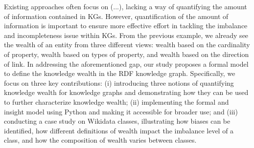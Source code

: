 Existing approaches often focus on (...), lacking a way of quantifying the amount of information contained in KGs. However, quantification of the amount of information is important to ensure more effective effort in tackling the imbalance and incompleteness issue within KGs. From the previous example, we already see the wealth of an entity from three different views: wealth based on the cardinality of property, wealth based on types of property, and wealth based on the direction of link. In addressing the aforementioned gap, our study proposes a formal model to define the knowledge wealth in the RDF knowledge graph. Specifically, we focus on three key contributions: (i) introducing three notions of quantifying knowledge wealth for knowledge graphs and demonstrating how they can be used to further characterize knowledge wealth; (ii) implementing the formal and insight model using Python and making it accessible for broader use; and (iii) conducting a case study on Wikidata classes, illustrating how biases can be identified, how different definitions of wealth impact the imbalance level of a class, and how the composition of wealth varies between classes.